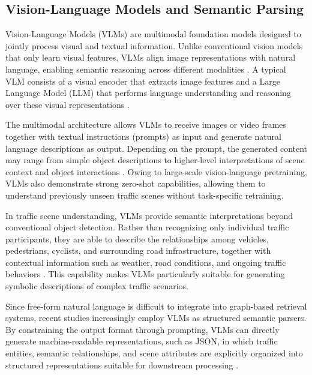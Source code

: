 \documentclass[a4paper, 11pt]{article} %
\begin{document}
\subsection{Vision-Language Models and Semantic Parsing}

Vision-Language Models (VLMs) are multimodal foundation models designed to jointly process visual and textual information. Unlike conventional vision models that only learn visual features, VLMs align image representations with natural language, enabling semantic reasoning across different modalities \cite{bordes2024introduction}. A typical VLM consists of a visual encoder that extracts image features and a Large Language Model (LLM) that performs language understanding and reasoning over these visual representations \cite{zhang2023vision}.

The multimodal architecture allows VLMs to receive images or video frames together with textual instructions (prompts) as input and generate natural language descriptions as output. Depending on the prompt, the generated content may range from simple object descriptions to higher-level interpretations of scene context and object interactions \cite{achiam2023gpt4}. Owing to large-scale vision-language pretraining, VLMs also demonstrate strong zero-shot capabilities, allowing them to understand previously unseen traffic scenes without task-specific retraining.



In traffic scene understanding, VLMs provide semantic interpretations beyond conventional object detection. Rather than recognizing only individual traffic participants, they are able to describe the relationships among vehicles, pedestrians, cyclists, and surrounding road infrastructure, together with contextual information such as weather, road conditions, and ongoing traffic behaviors \cite{zheng2025video,zhang2023vision}. This capability makes VLMs particularly suitable for generating symbolic descriptions of complex traffic scenarios.

Since free-form natural language is difficult to integrate into graph-based retrieval systems, recent studies increasingly employ VLMs as structured semantic parsers. By constraining the output format through prompting, VLMs can directly generate machine-readable representations, such as JSON, in which traffic entities, semantic relationships, and scene attributes are explicitly organized into structured representations suitable for downstream processing \cite{tian2025query}.
\end{document}

